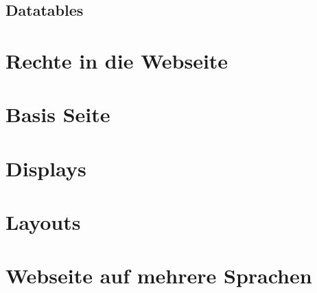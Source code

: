 \subsection{Datatables}

\section{Rechte in die Webseite}

\section{Basis Seite}


\section{Displays}


\section{Layouts}

\section{Webseite auf mehrere Sprachen}
